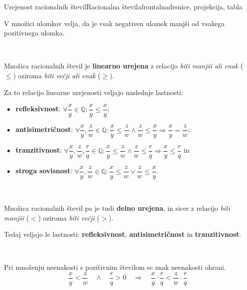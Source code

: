 \begin{priprava}{7}{}{Urejenost racionalnih števil}{Racionalna števila}{frontalna}{drsnice, projekcija, tabla}
\begin{figure}[H]
    \end{figure}

    

    V množici ulomkov velja, da je vsak negativen ulomek manjši od vsakega pozitivnega ulomka.


    ~

    Množica racionalnih števil je \textbf{linearno urejena} z relacijo \textit{biti manjši ali enak} ($\leq$) oziroma \textit{biti večji ali enak} ($\geq$). 
    
    Za to relacijo linearne urejenosti veljajo naslednje lastnosti:

    \begin{itemize}
        \item \textbf{refleksivnost}: $\forall \dfrac{x}{y}\in\mathbb{Q}: \dfrac{x}{y}\leq\dfrac{x}{y}$;
        \item \textbf{antisimetričnost}: $\forall \dfrac{x}{y},\dfrac{z}{w}\in\mathbb{Q}: \dfrac{x}{y}\leq\dfrac{z}{w}  \land \dfrac{z}{w}\leq\dfrac{x}{y} \Rightarrow \dfrac{x}{y}=\dfrac{z}{w}$;
        \item \textbf{tranzitivnost}: $\forall \dfrac{x}{y},\dfrac{z}{w},\dfrac{r}{q}\in\mathbb{Q}: \dfrac{x}{y}\leq\dfrac{z}{w}  \land \dfrac{z}{w}\leq\dfrac{r}{q} \Rightarrow \dfrac{x}{y}\leq\dfrac{r}{q}$ in 
        \item \textbf{stroga sovisnost}: $\forall \dfrac{x}{y},\dfrac{z}{w}\in\mathbb{Q}: \dfrac{x}{y}\leq\dfrac{z}{w}  \lor \dfrac{z}{w}\leq\dfrac{x}{y}$.
    \end{itemize}

~

    Množica racionalnih števil pa je tudi \textbf{delno urejena}, in sicer z relacijo \textit{biti manjši} ($<$) oziroma \textit{biti večji} ($>$). 

    Tedaj veljajo le lastnosti: \textbf{refleksivnost}, \textbf{antisimetričnost} in \textbf{tranzitivnost}.


    ~

    Pri množenju neenakosti s pozitivnim številom se znak neenakosti ohrani.
    $$ \dfrac{x}{y}<\dfrac{z}{w} \quad \wedge \quad \dfrac{r}{q}>0 \quad \Rightarrow \quad \dfrac{x}{y}\cdot\dfrac{r}{q}<\dfrac{z}{w}\cdot\dfrac{r}{q} $$


\end{priprava}
